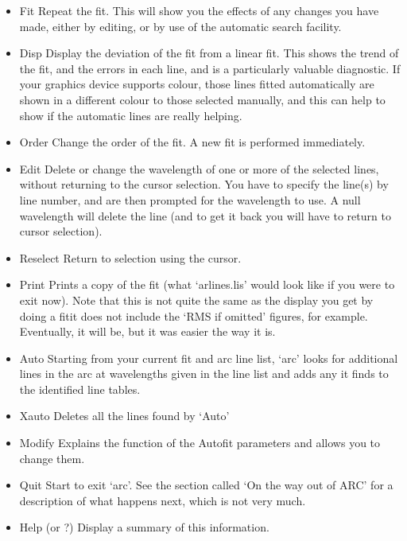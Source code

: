 \begin{itemize}
\item
   Fit \latorhtm{---}{-} Repeat the fit.  This will show you the effects of any
   changes you have made, either by editing, or by use of the automatic
   search facility.
\item
   Disp \latorhtm{---}{-} Display the deviation of the fit from a linear fit.
   This
   shows the trend of the fit, and the errors in each line, and is a
   particularly valuable diagnostic.  If your graphics device supports
   colour, those lines fitted automatically are shown in a different
   colour to those selected manually, and this can help to show if the
   automatic lines are really helping.
\item
   Order \latorhtm{---}{-} Change the order of the fit.  A new fit is performed
   immediately.
\item
   Edit \latorhtm{---}{-} Delete or change the wavelength of one or more of the
   selected lines, without returning to the cursor selection.  You have
   to specify the line(s) by line number, and are then prompted for the
   wavelength to use.  A null wavelength will delete the line (and to
   get it back you will have to return to cursor selection).
\item
   Reselect \latorhtm{---}{-} Return to selection using the cursor.
\item
   Print \latorhtm{---}{-} Prints a copy of the fit (what `arlines.lis' would
   look
   like if you were to exit now).  Note that this is not quite the same
   as the display you get by doing a fit\latorhtm{---}{-}it does not include
   the `RMS
   if omitted' figures, for example.  Eventually, it will be, but it was
   easier the way it is.
\item
   Auto \latorhtm{---}{-} Starting from your current fit and arc line list,
   `arc'
   looks for additional lines in the arc at wavelengths given in the
   line list and adds any it finds to the identified line tables.
\item
   Xauto \latorhtm{---}{-} Deletes all the lines found by `Auto'
\item
   Modify \latorhtm{---}{-} Explains the function of the Autofit parameters and
   allows you to change them.
\item
   Quit \latorhtm{---}{-} Start to exit `arc'.  See the section called `On
   the way out
   of ARC' for a description of what happens next, which is not very
   much.
\item
   Help \latorhtm{---}{-} (or ?) Display a summary of this information.
\end{itemize}


